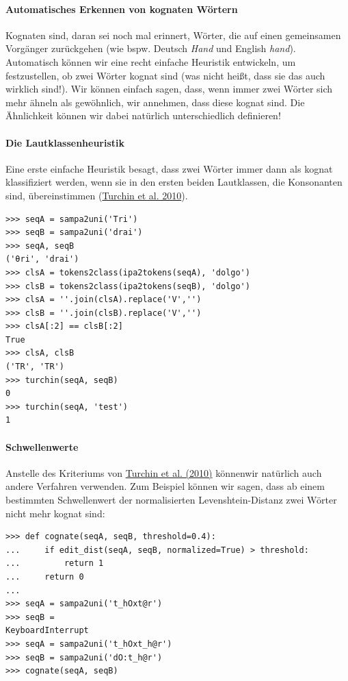 \paragraph{Automatisches Erkennen von kognaten Wörtern}

Kognaten sind, daran sei noch mal erinnert, Wörter, die auf einen
gemeinsamen Vorgänger zurückgehen (wie bspw. Deutsch \emph{Hand} und
English \emph{hand}). Automatisch können wir eine recht einfache
Heuristik entwickeln, um festzustellen, ob zwei Wörter kognat sind (was
nicht heißt, dass sie das auch wirklich sind!). Wir können einfach
sagen, dass, wenn immer zwei Wörter sich mehr ähneln als gewöhnlich, wir
annehmen, dass diese kognat sind. Die Ähnlichkeit können wir dabei
natürlich unterschiedlich definieren!




\paragraph{Die Lautklassenheuristik}

Eine erste einfache Heuristik besagt, dass zwei Wörter immer dann als
kognat klassifiziert werden, wenn sie in den ersten beiden Lautklassen,
die Konsonanten sind, übereinstimmen
(\href{http://bibliography.lingpy.org?key=Turchin2010}{Turchin et al.
2010}).

\begin{verbatim}
>>> seqA = sampa2uni('Tri')
>>> seqB = sampa2uni('drai')
>>> seqA, seqB 
('θri', 'drai')
>>> clsA = tokens2class(ipa2tokens(seqA), 'dolgo')
>>> clsB = tokens2class(ipa2tokens(seqB), 'dolgo')
>>> clsA = ''.join(clsA).replace('V','')
>>> clsB = ''.join(clsB).replace('V','')
>>> clsA[:2] == clsB[:2]
True
>>> clsA, clsB
('TR', 'TR')
>>> turchin(seqA, seqB)
0
>>> turchin(seqA, 'test')
1
\end{verbatim}




\paragraph{Schwellenwerte}

Anstelle des Kriteriums von
\href{http://bibliography.lingpy.org?key=Turchin2010}{Turchin et al.
(2010)} könnenwir natürlich auch andere Verfahren verwenden. Zum
Beispiel können wir sagen, dass ab einem bestimmten Schwellenwert der
normalisierten Levenshtein-Distanz zwei Wörter nicht mehr kognat sind:

\begin{verbatim}
>>> def cognate(seqA, seqB, threshold=0.4):
...     if edit_dist(seqA, seqB, normalized=True) > threshold:
...         return 1
...     return 0
... 
>>> seqA = sampa2uni('t_hOxt@r')
>>> seqB = 
KeyboardInterrupt
>>> seqA = sampa2uni('t_hOxt_h@r')
>>> seqB = sampa2uni('dO:t_h@r')
>>> cognate(seqA, seqB)
\end{verbatim}



